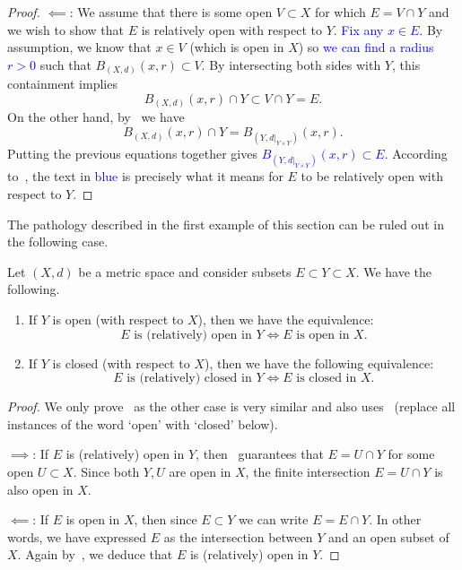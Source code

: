 \begin{prop}
\begin{proof}
	$\impliedby$: We assume that there is some open $V\subset X$ for which $E = V\cap Y$ and we wish to show that $E$ is relatively open with respect to $Y$. \textcolor{blue}{Fix any $x \in E$.} By assumption, we know that $x \in V$ (which is open in $X$) so \textcolor{blue}{we can find a radius $r>0$} such that $B_{(X,d)}(x,r)\subset V$. By intersecting both sides with $Y$, this containment implies
	\[
	B_{(X,d)}(x,r)\cap Y \subset V \cap Y = E.
	\]
	On the other hand, by~ we have
	\[
	B_{(X,d)}(x,r)\cap Y = B_{(Y,d|_{Y\times Y})}(x,r).
	\]
	Putting the previous equations together gives \textcolor{blue}{$B_{(Y,d|_{Y\times Y})}(x,r) \subset E$.} According to~, the text in \textcolor{blue}{blue} is precisely what it means for $E$ to be relatively open with respect to $Y$.
\end{proof}
\end{prop}
The pathology described in the first example of this section can be ruled out in the following case.
\begin{prop}
\label{prop:triple_rel}
Let $(X,d)$ be a metric space and consider subsets $E\subset Y \subset X$. We have the following.
\begin{enumerate}
\item \label{triple_rel_open} If $Y$ is open (with respect to $X$), then we have the equivalence:
\[
E\text{ is (relatively) open in }Y \iff E\text{ is open in }X.
\]
\item \label{triple_rel_closed} If $Y$ is closed (with respect to $X$), then we have the following equivalence:
\[
E\text{ is (relatively) closed in }Y \iff E\text{ is closed in }X.
\]
\end{enumerate}
\end{prop}
\begin{proof}
We only prove~ as the other case is very similar and also uses~ (replace all instances of the word `open' with `closed' below). 

$\implies$: If $E$ is (relatively) open in $Y$, then~ guarantees that $E = U\cap Y$ for some open $U\subset X$. Since both $Y,U$ are open in $X$, the finite intersection $E = U \cap Y$ is also open in $X$.

$\impliedby$: If $E$ is open in $X$, then since $E\subset Y$ we can write $E = E \cap Y$. In other words, we have expressed $E$ as the intersection between $Y$ and an open subset of $X$. Again by~, we deduce that $E$ is (relatively) open in $Y$.
\end{proof}